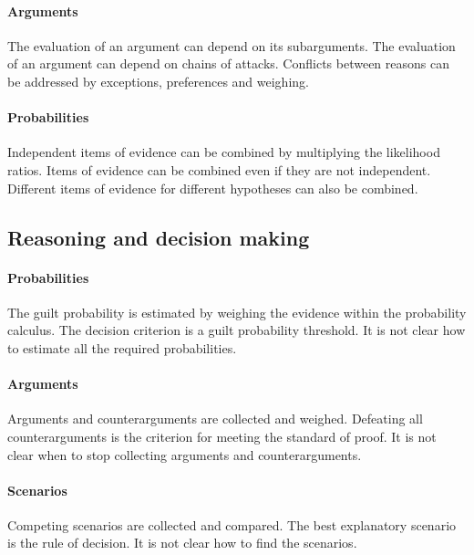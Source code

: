 \documentclass[10pt]{article}
\begin{document}
\paragraph{Arguments}
	The evaluation of an argument can depend on its subarguments.
	The evaluation of an argument can depend on chains of attacks.
	Conflicts between reasons can be addressed by exceptions, preferences and weighing.
	
\paragraph{Probabilities}
	Independent items of evidence can be combined by multiplying the likelihood ratios.
	Items of evidence can be combined even if they are not independent.
	Different items of evidence for different hypotheses can also be combined.

\subsection*{Reasoning and decision making}

\paragraph{Probabilities}
	The guilt probability is estimated by weighing the evidence within the probability calculus.
	The decision criterion is a guilt probability threshold.
	It is not clear how to estimate all the required probabilities.
	
\paragraph{Arguments}
	Arguments and counterarguments are collected and weighed.
	Defeating all counterarguments is the criterion for meeting the standard of proof.
	It is not clear when to stop collecting arguments and counterarguments.
	
\paragraph{Scenarios}
	Competing scenarios are collected and compared.
	The best explanatory scenario is the rule of decision.
	It is not clear how to find the scenarios.
	
\end{document}
